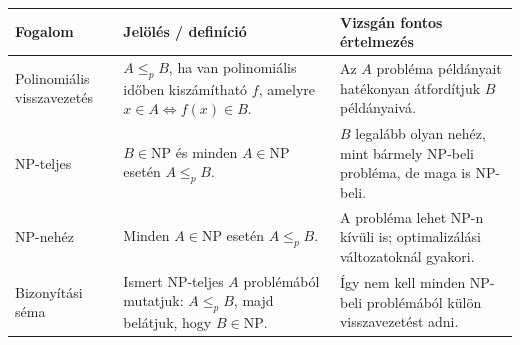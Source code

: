 \begin{tabularx}{\textwidth}{L{31mm}L{52mm}X}
\toprule
\textbf{Fogalom} & \textbf{Jelölés / definíció} & \textbf{Vizsgán fontos értelmezés} \\
\midrule
Polinomiális visszavezetés & $A\leq_p B$, ha van polinomiális időben kiszámítható $f$, amelyre $x\in A\Leftrightarrow f(x)\in B$. & Az $A$ probléma példányait hatékonyan átfordítjuk $B$ példányaivá. \\
NP-teljes & $B\in\mathrm{NP}$ és minden $A\in\mathrm{NP}$ esetén $A\leq_p B$. & $B$ legalább olyan nehéz, mint bármely NP-beli probléma, de maga is NP-beli. \\
NP-nehéz & Minden $A\in\mathrm{NP}$ esetén $A\leq_p B$. & A probléma lehet NP-n kívüli is; optimalizálási változatoknál gyakori. \\
Bizonyítási séma & Ismert NP-teljes $A$ problémából mutatjuk: $A\leq_p B$, majd belátjuk, hogy $B\in\mathrm{NP}$. & Így nem kell minden NP-beli problémából külön visszavezetést adni. \\
\bottomrule
\end{tabularx}
